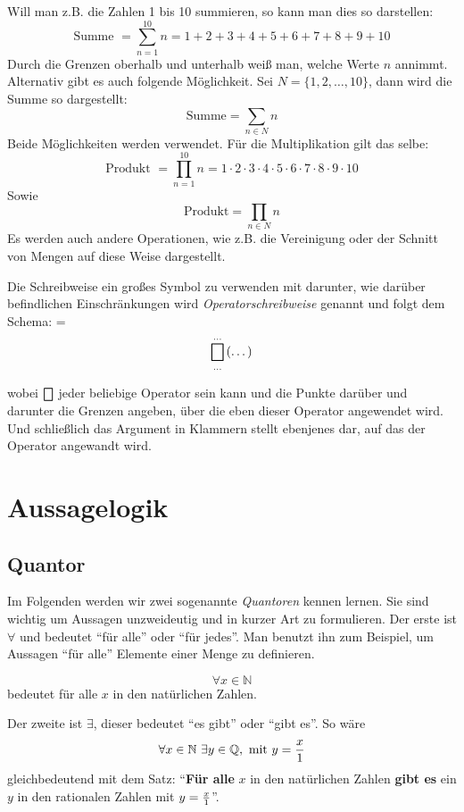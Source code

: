Will man z.B. die Zahlen 1 bis 10 summieren, so kann man dies so darstellen:
\[ \text{Summe } = \sum_{n=1}^{10} n = 1+2+3+4+5+6+7+8+9+10 \]
Durch die Grenzen oberhalb und unterhalb weiß man, welche Werte $n$ annimmt. Alternativ gibt es auch folgende Möglichkeit. Sei $N = \{ 1,2, \dots ,10 \}$, dann wird die Summe so dargestellt:
\[ \text{Summe} = \sum_{n\in N} n \]
Beide Möglichkeiten werden verwendet. 
Für die Multiplikation gilt das selbe:
\[ \text{Produkt } = \prod_{n=1}^{10} n = 1\cdot 2\cdot 3\cdot 4\cdot 5\cdot 6\cdot 7\cdot 8\cdot 9\cdot 10 \]
Sowie
\[ \text{Produkt} = \prod_{n\in N} n  \]
Es werden auch andere Operationen, wie z.B. die Vereinigung oder der Schnitt von Mengen auf diese Weise dargestellt. 
\begin{definition}
Die Schreibweise ein großes Symbol zu verwenden mit darunter, wie darüber befindlichen Einschränkungen wird \textsl{Operatorschreibweise} genannt und folgt dem Schema:
 = \[ \bigbox_{\dots}^{\dots}\left( \dots \right) \]
\end{definition}
wobei $\bigbox$ jeder beliebige Operator sein kann und die Punkte darüber und darunter die Grenzen angeben, über die eben dieser Operator angewendet wird. Und schließlich das Argument in Klammern stellt ebenjenes dar, auf das der Operator angewandt wird. 

\section{Aussagelogik}

\subsection{Quantor}

Im Folgenden werden wir zwei sogenannte \textsl{Quantoren} kennen lernen. Sie sind wichtig um Aussagen unzweideutig und in kurzer Art zu formulieren. Der erste ist $\forall$ und bedeutet "`für alle"' oder "`für jedes"'. Man benutzt ihn zum Beispiel, um Aussagen "`für alle"' Elemente einer Menge zu definieren.

\[ \forall x\in \mathbb{N} \]
bedeutet für alle $x$ in den natürlichen Zahlen.

Der zweite ist $\exists$, dieser bedeutet "`es gibt"' oder "`gibt es"'. So wäre 
\[ \forall x\in \mathbb{N}\ \exists y\in \mathbb{Q},\text{ mit }  y={x\over 1} \]
gleichbedeutend mit dem Satz: "`\textbf{Für alle} $x$ in den natürlichen Zahlen \textbf{gibt es} ein $y$ in den rationalen Zahlen mit $y={x \over 1}$"'.

